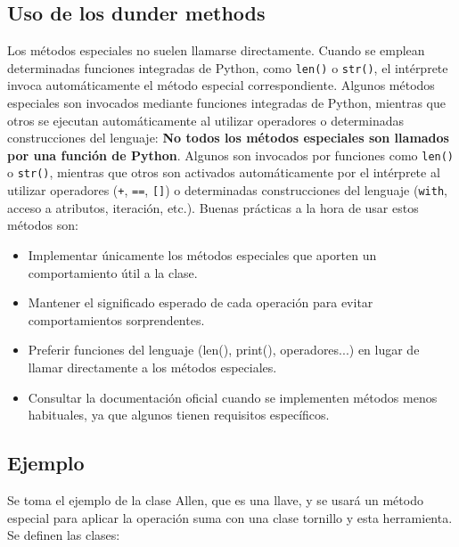 \documentclass[11pt,a5paper,twoside]{book}
\begin{document}
\subsection{Uso de los dunder methods}
Los métodos especiales no suelen llamarse directamente. Cuando se emplean determinadas funciones integradas de Python, como {\scriptsize \texttt{len()}} o {\scriptsize \texttt{str()}}, el intérprete invoca automáticamente el método especial correspondiente.
Algunos métodos especiales son invocados mediante funciones integradas de Python, mientras que otros se ejecutan automáticamente al utilizar operadores o determinadas construcciones del lenguaje:
\textbf{No todos los métodos especiales son llamados por una función de Python}. Algunos son invocados por funciones como {\scriptsize \texttt{len()}} o {\scriptsize \texttt{str()}}, mientras que otros son activados automáticamente por el intérprete al utilizar operadores ({\scriptsize \texttt{+}}, {\scriptsize \texttt{==}}, {\scriptsize \texttt{[]}}) o determinadas construcciones del lenguaje ({\scriptsize \texttt{with}}, acceso a atributos, iteración, etc.).
Buenas prácticas a la hora de usar estos métodos son:

\begin{itemize}
\item  Implementar únicamente los métodos especiales que aporten un comportamiento útil a la clase.
\item  Mantener el significado esperado de cada operación para evitar comportamientos sorprendentes.
\item  Preferir funciones del lenguaje (len(), print(), operadores...) en lugar de llamar directamente a los métodos especiales.
\item  Consultar la documentación oficial cuando se implementen métodos menos habituales, ya que algunos tienen requisitos específicos.
\end{itemize}
\subsection{Ejemplo}
Se toma el ejemplo de la clase Allen, que es una llave, y se usará un método especial para aplicar la operación suma con una clase tornillo y esta herramienta. Se definen las clases:

\newpage
\end{document}
